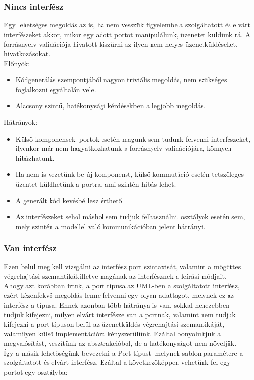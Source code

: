 \documentclass[a4paper,12pt]{report}
\begin{document}
\subsubsection{Nincs interfész}
Egy lehetséges megoldás az is, ha nem vesszük figyelembe a szolgáltatott és elvárt interfészeket akkor, mikor egy adott portot manipulálunk, üzenetet küldünk rá. A forrásnyelv validációja hivatott kiszűrni az ilyen nem helyes üzenetküldéseket, hivatkozásokat. \\
Előnyök:
\begin{itemize}
\item Kódgenerálás szempontjából nagyon triviális megoldás, nem szükséges foglalkozni egyáltalán vele.
\item Alacsony szintű, hatékonysági kérdésekben a legjobb megoldás. 
\end{itemize}
Hátrányok:
\begin{itemize}
\item Külső komponensek, portok esetén magunk sem tudunk felvenni interfészeket, ilyenkor már nem hagyatkozhatunk a forrásnyelv validációjára, könnyen hibázhatunk.
\item Ha nem is vezetünk be új komponenst, külső kommutáció esetén tetszőleges üzentet küldhetünk a portra, ami szintén hibás lehet.
\item A generált kód kevésbé lesz érthető
\item Az interfészeket sehol máshol sem tudjuk felhasználni, osztályok esetén sem, mely szintén a modellel való kommunikációban jelent hátrányt. 
\end{itemize}

\subsubsection{Van interfész}
Ezen belül meg kell vizsgálni az interfész port szintaxisát, valamint a mögöttes végrehajtási szemantikát,illetve magának az interfésznek a leírási módjait. \\
Ahogy azt korábban írtuk, a port típusa az UML-ben a szolgáltatott interfész, ezért kézenfekvő megoldás lenne felvenni egy olyan adattagot, melynek ez az interfész a típusa. Ennek azonban több hátránya is van, sokkal nehezebben tudjuk kifejezni, milyen elvárt interfésze van a portnak, valamint nem tudjuk kifejezni a port típuson belül az üzenetküldés végrehajtási szemantikáját, valamilyen külső implementációra kényszerülünk. Ezáltal bonyolultjuk a megvalósítást, veszítünk az absztrakcióból, de a hatékonyságot nem növeljük. \\
Így a másik lehetőségünk bevezetni a Port típust, melynek sablon paramétere a szolgáltatott és elvárt interfész. Ezáltal a következőképpen vehetünk fel egy portot egy osztályba: \\
\end{document}
